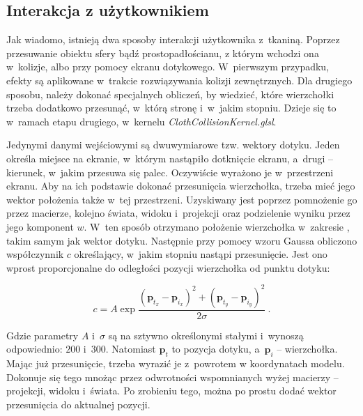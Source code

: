 		\subsection{Interakcja z użytkownikiem}
		\label{t:symulacja:dzialanie:interakcja}
			
		
		Jak wiadomo, istnieją dwa sposoby interakcji użytkownika z~tkaniną. Poprzez przesuwanie obiektu sfery bądź prostopadłościanu, z którym wchodzi ona w~kolizje, albo przy pomocy ekranu dotykowego. W~pierwszym przypadku, efekty są aplikowane w~trakcie rozwiązywania kolizji zewnętrznych. Dla drugiego sposobu, należy dokonać specjalnych obliczeń, by wiedzieć, które wierzchołki trzeba dodatkowo przesunąć, w~którą stronę i~w~jakim stopniu. Dzieje się to w~ramach etapu drugiego, w~kernelu \emph{ClothCollisionKernel.glsl}.
		
		Jedynymi danymi wejściowymi są dwuwymiarowe tzw. wektory dotyku. Jeden określa miejsce na ekranie, w~którym nastąpiło dotknięcie ekranu, a~drugi -- kierunek, w~jakim przesuwa się palec. Oczywiście wyrażono je w~przestrzeni ekranu. Aby na ich podstawie dokonać przesunięcia wierzchołka, trzeba mieć jego wektor położenia także w~tej przestrzeni. Uzyskiwany jest poprzez pomnożenie go przez macierze, kolejno świata, widoku i~projekcji oraz podzielenie wyniku przez jego komponent \(w\). W~ten sposób otrzymano położenie wierzchołka w~zakresie \(<-1, 1>\), takim samym jak wektor dotyku. Następnie przy pomocy wzoru Gaussa obliczono współczynnik \(c\) określający, w~jakim stopniu nastąpi przesunięcie. Jest ono wprost proporcjonalne do odległości pozycji wierzchołka od punktu dotyku:
		
		
		\begin{equation}
		c = A\exp{\frac{(\mathbf{p}_{t_{x}} - \mathbf{p}_{i_{x}})^{2} + (\mathbf{p}_{t_{y}} - \mathbf{p}_{i_{y}})^{2}}{2 \sigma}} \ .
		\end{equation} 
		
		Gdzie parametry \( A \) i~\( \sigma \) są na sztywno określonymi stałymi i~wynoszą odpowiednio: \(200\) i~\(300\). Natomiast \( \mathbf{p}_{t} \) to pozycja dotyku, a~\( \mathbf{p}_{i} \)  -- wierzchołka. Mając już przesunięcie, trzeba wyrazić je z~powrotem w koordynatach modelu. Dokonuje się tego mnożąc przez odwrotności wspomnianych wyżej macierzy -- projekcji, widoku i~świata. Po zrobieniu tego, można po prostu dodać wektor przesunięcia do aktualnej pozycji.
		\newline
		
